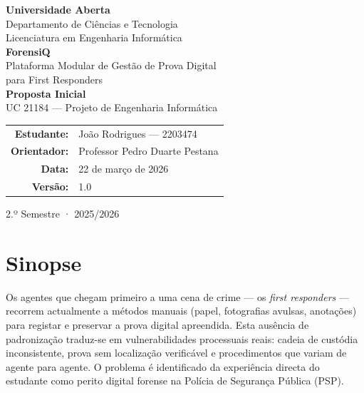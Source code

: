\documentclass[a4paper,11pt]{article}
\begin{document}
\begin{titlepage}
\centering
\vspace*{2cm}

{\Large\bfseries Universidade Aberta}\\[0.3cm]
{\large Departamento de Ciências e Tecnologia}\\[0.3cm]
{\large Licenciatura em Engenharia Informática}\\[2cm]

{\LARGE\bfseries ForensiQ}\\[0.4cm]
{\large Plataforma Modular de Gestão de Prova Digital\\para First Responders}\\[2.5cm]

{\large\bfseries Proposta Inicial}\\[0.3cm]
{\large UC 21184 — Projeto de Engenharia Informática}\\[1.5cm]

\begin{tabular}{rl}
\textbf{Estudante:} & João Rodrigues — 2203474 \\
\textbf{Orientador:} & Professor Pedro Duarte Pestana \\
\textbf{Data:} & 22 de março de 2026 \\
\textbf{Versão:} & 1.0 \\
\end{tabular}

\vfill
{\small 2.º Semestre · 2025/2026}
\end{titlepage}

\tableofcontents
\newpage

\section{Sinopse}

Os agentes que chegam primeiro a uma cena de crime — os \emph{first responders} —
recorrem actualmente a métodos manuais (papel, fotografias avulsas, anotações)
para registar e preservar a prova digital apreendida. Esta ausência de
padronização traduz-se em vulnerabilidades processuais reais: cadeia de custódia
inconsistente, prova sem localização verificável e procedimentos que variam de
agente para agente. O problema é identificado da experiência directa do estudante
como perito digital forense na Polícia de Segurança Pública (PSP).
\end{document}
